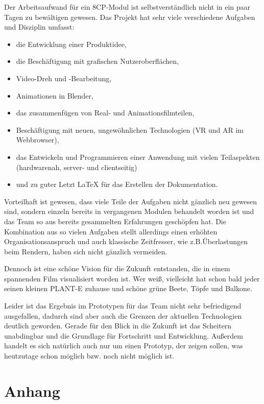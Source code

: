 Der Arbeitsaufwand für ein 8CP-Modul ist selbstverständlich nicht in ein
paar Tagen zu bewältigen gewesen. Das Projekt hat sehr viele
verschiedene Aufgaben und Disziplin umfasst:

\begin{itemize}
\tightlist
\item
  die Entwicklung einer Produktidee,
\item
  die Beschäftigung mit grafischen Nutzeroberflächen,
\item
  Video-Dreh und -Bearbeitung,
\item
  Animationen in Blender,
\item
  das zusammenfügen von Real- und Animationsfilmteilen,
\item
  Beschäftigung mit neuen, ungewöhnlichen Technologien (VR und AR im
  Webbrowser),
\item
  das Entwickeln und Programmieren einer Anwendung mit vielen
  Teilaspekten (hardwarenah, server- und clientseitig)
\item
  und zu guter Letzt LaTeX für das Erstellen der Dokumentation.
\end{itemize}

Vorteilhaft ist gewesen, dass viele Teile der Aufgaben nicht gänzlich
neu gewesen sind, sondern einzeln bereits in vergangenen Modulen
behandelt worden ist und das Team so aus bereits gesammelten Erfahrungen
geschöpfen hat. Die Kombination aus so vielen Aufgaben stellt allerdings
einen erhöhten Organisationsanspruch und auch klassische Zeitfresser,
wie z.B.Überlastungen beim Rendern, haben sich nicht gänzlich vermeiden.

Dennoch ist eine schöne Vision für die Zukunft entstanden, die in einem
spannenden Film visualisiert worden ist. Wer weiß, vielleicht hat schon
bald jeder seinen kleinen PLANT-E zuhause und schöne grüne Beete, Töpfe
und Balkone.

Leider ist das Ergebnis im Prototypen für das Team nicht sehr
befriedigend ausgefallen, dadurch sind aber auch die Grenzen der
aktuellen Technologien deutlich geworden. Gerade für den Blick in die
Zukunft ist das Scheitern unabdingbar und die Grundlage für Fortschritt
und Entwicklung. Außerdem handelt es sich natürlich auch nur um einen
Prototyp, der zeigen sollen, was heutzutage schon möglich bzw. noch
nicht möglich ist.

\hypertarget{anhang}{%
\section{Anhang}\label{anhang}}
